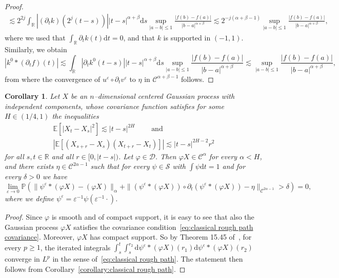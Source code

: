 \documentclass[11pt,a4paper]{article}
\newcommand{\cdummy}{\cdot}
\newcommand{\mathd}{\mathrm{d}}
\newcommand{\tmop}[1]{\ensuremath{\operatorname{#1}}}
\newtheorem{corollary}[theorem]{Corollary}
\theoremstyle{remark}
\newcommand{\CC}{\ensuremath{\mathscr{C}}}
\newcommand{\CD}{\ensuremath{\mathscr{D}}}
\newcommand{\CS}{\ensuremath{\mathscr{S}}}
\begin{document}
\begin{proof}
\begin{gather*}
     \lesssim 2^{2j} \int_{\mathbb{R}} | ( \partial_{t} k ) ( 2^{j} ( t-s ) ) |   | t-s |^{\alpha + \beta} \mathd s \sup_{| a-b | \leqslant 1} \frac{| f( b ) -f ( a ) |}{| b-a |^{\alpha + \beta}} \lesssim 2^{-j ( \alpha + \beta -1 )} \sup_{| a-b | \leqslant 1} \frac{| f ( b ) -f ( a ) |}{| b-a |^{\alpha + \beta}},
  \end{gather*}
  where we used that $\int_{\mathbb{R}} \partial_{t} k ( t ) \mathd t=0$,
  and that $k$ is supported in $( -1,1)$. Similarly, we obtain
  \[
     | k^{0} \ast ( \partial_{t} f ) ( t ) |  \lesssim \int_{\mathbb{R}} | \partial_{t} k^{0} ( t-s ) |   | t-s |^{\alpha + \beta} \mathd s \sup_{| a-b | \leqslant 1} \frac{| f ( b ) -f ( a ) |}{| b-a |^{\alpha + \beta}} \lesssim \sup_{| a-b | \leqslant 1} \frac{| f ( b ) -f ( a ) |}{| b-a |^{\alpha + \beta}},
  \]
  from where the convergence of $u^{\varepsilon} \circ \partial_{t} v^{\varepsilon}$ to $\eta$ in $\CC^{\alpha + \beta -1}$ follows.
\end{proof}

\begin{corollary}\label{corollary:existence of rough path area}
  Let $X$ be an $n$--dimensional centered Gaussian process with independent components, whose covariance function satisfies for some $H \in ( 1/4,1 )$ the inequalities
  \begin{gather}\label{eq:classical rough path covariance} \nonumber
     \mathbb{E} [ | X_{t} -X_{s} |^{2} ] \lesssim | t-s |^{2H} \hspace{2em} \tmop{and} \\
     | \mathbb{E} [ ( X_{s+r} -X_{s} ) ( X_{t+r} -X_{t} ) ] | \lesssim | t-s |^{2H-2}  r^{2}
  \end{gather}
  for all $s,t \in \mathbb{R}$ and all $r \in [ 0, | t-s | )$. Let $\varphi \in \CD$. Then $\varphi X \in \CC^{\alpha}$ for every $\alpha <H$, and there
  exists $\eta \in \CC^{2 \alpha -1}$ such that for every $\psi \in \CS$ with
  $\int \psi \mathd t=1$ and for every $\delta >0$ we have
  \[
     \lim_{\varepsilon \rightarrow 0} \mathbb{P} \left( \| \psi^{\varepsilon}  \ast ( \varphi X ) - ( \varphi X ) \|_{\alpha} + \| ( \psi^{\varepsilon}  \ast ( \varphi X ) ) \circ \partial_{t} ( \psi^{\varepsilon} \ast (\varphi X ) ) - \eta \|_{\CC^{2 \alpha -1}} > \delta \right) =0,
  \]
  where we define $\psi^{\varepsilon} = \varepsilon^{-1} \psi (\varepsilon^{-1} \cdummy )$.
\end{corollary}

\begin{proof}
  Since $\varphi$ is smooth and of compact support, it is easy to see that
  also the Gaussian process $\varphi X$ satisfies the covariance
  condition~{\eqref{eq:classical rough path covariance}}. Moreover, $\varphi X$ has compact support. So by Theorem 15.45 of~{\cite{Friz2010}}, for every $p \geqslant 1$, the
  iterated integrals $\int_{s}^{t} \int_{s}^{r_{2}} \mathd \psi^{\varepsilon} \ast ( \varphi X ) ( r_{1} ) \mathd \psi^{\varepsilon} \ast ( \varphi X ) ( r_{2} )$ converge in $L^{p}$ in the sense of~{\eqref{eq:classical rough path}}. The statement then follows from Corollary~\ref{corollary:classical rough path}.
\end{proof}
\end{document}

